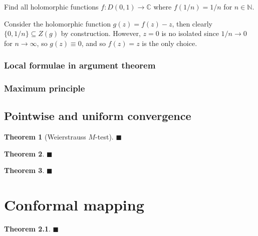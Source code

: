 \documentclass[letter-paper]{tufte-book}
\newtheorem{theorem}{\color{pastel-blue}Theorem}[section]
\newenvironment{example}[1][Example]{\begin{trivlist}
\item[\hskip \labelsep {\bfseries #1}]}{\end{trivlist}}
\newcommand{\qed}{\hfill$\blacksquare$}
\begin{document}
\begin{example}
  Find all holomorphic functions $f:D(0, 1) \to \mathbb{C}$ where $f(1/n) = 1/n$
  for $n\in\mathbb{N}$.
  
  Consider the holomorphic function $g(z) = f(z) - z$, then clearly $\{0, 1/n\}
  \subseteq Z(g)$ by construction. However, $z=0$ is no isolated since $1/n\to
  0$ for $n\to \infty$, so $g(z) \equiv 0$, and so $f(z) = z$ is the only
  choice.
\end{example}


\subsection{Local formulae in argument theorem}


\subsection{Maximum principle}


\section{Pointwise and uniform convergence}

\begin{theorem}[Weierstrauss $M$-test]

\qed

\end{theorem}

\begin{theorem}

\qed

\end{theorem}

\begin{theorem}

\qed

\end{theorem}


\chapter{Conformal mapping}

\begin{theorem}

\qed

\end{theorem}
\end{document}
